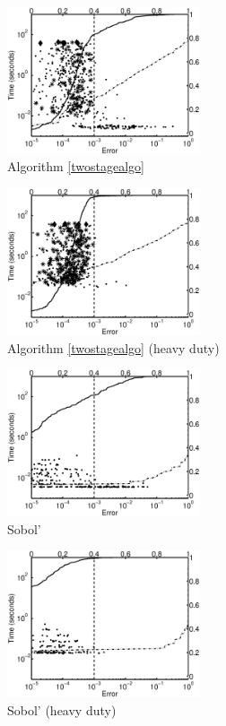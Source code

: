 \documentclass[graybox]{svmult}
\begin{document}
\begin{figure}
\begin{minipage}{5.7cm} \centering \includegraphics[width=5.7cm]{137gaussiand=1iidErrTime.eps} \\ Algorithm \ref{twostagealgo}  \end{minipage}
\begin{minipage}{5.7cm} \centering \includegraphics[width=5.7cm]{137gaussiand=1iidheavyErrTime.eps} \\ Algorithm \ref{twostagealgo} (heavy duty)\end{minipage}
\begin{minipage}{5.7cm} \centering \includegraphics[width=5.7cm]{137gaussiand=1SobolErrTime.eps} \\  Sobol'\end{minipage}
\begin{minipage}{5.7cm} \centering \includegraphics[width=5.7cm]{137gaussiand=1SobolheavyErrTime.eps} \\ Sobol' (heavy duty) \end{minipage}

\end{figure}
\end{document}
